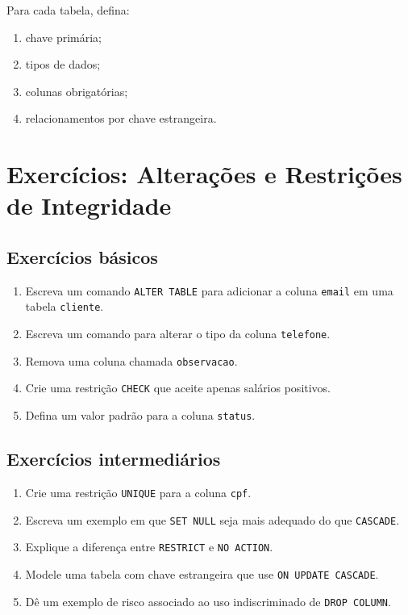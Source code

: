 Para cada tabela, defina:
\begin{enumerate}
    \item chave primária;
    \item tipos de dados;
    \item colunas obrigatórias;
    \item relacionamentos por chave estrangeira.
\end{enumerate}



\section{Exercícios: Alterações e Restrições de Integridade}
\subsection{Exercícios básicos}

\begin{enumerate}
    \item Escreva um comando \texttt{ALTER TABLE} para adicionar a coluna \texttt{email} em uma tabela \texttt{cliente}.
    \item Escreva um comando para alterar o tipo da coluna \texttt{telefone}.
    \item Remova uma coluna chamada \texttt{observacao}.
    \item Crie uma restrição \texttt{CHECK} que aceite apenas salários positivos.
    \item Defina um valor padrão para a coluna \texttt{status}.
\end{enumerate}

\subsection{Exercícios intermediários}

\begin{enumerate}
    \item Crie uma restrição \texttt{UNIQUE} para a coluna \texttt{cpf}.
    \item Escreva um exemplo em que \texttt{SET NULL} seja mais adequado do que \texttt{CASCADE}.
    \item Explique a diferença entre \texttt{RESTRICT} e \texttt{NO ACTION}.
    \item Modele uma tabela com chave estrangeira que use \texttt{ON UPDATE CASCADE}.
    \item Dê um exemplo de risco associado ao uso indiscriminado de \texttt{DROP COLUMN}.
\end{enumerate}

